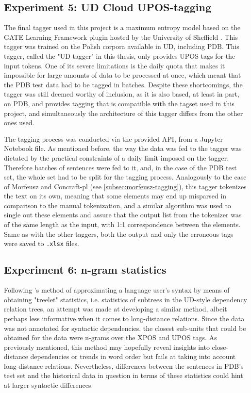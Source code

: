 \subsection{Experiment 5: UD Cloud UPOS-tagging}
\label{subsec:ud-tagging}

The final tagger used in this project is a maximum entropy model based on the GATE Learning Framework plugin hosted by the University of Sheffield \citep{gatecloud}. This tagger was trained on the Polish corpora available in UD, including PDB. This tagger, called the "UD tagger" in this thesis, only provides UPOS tags for the input tokens. One of its severe limitations is the daily quota that makes it impossible for large amounts of data to be processed at once, which meant that the PDB test data had to be tagged in batches. Despite these shortcomings, the tagger was still deemed worthy of inclusion, as it is also based, at least in part, on PDB, and provides tagging that is compatible with the tagset used in this project, and simultaneously the architecture of this tagger differs from the other ones used.

The tagging process was conducted via the provided API, from a Jupyter Notebook file. As mentioned before, the way the data was fed to the tagger was dictated by the practical constraints of a daily limit imposed on the tagger. Therefore batches of sentences were fed to it, and, in the case of the PDB test set, the whole set had to be split for the tagging process. Analogously to the case of Morfeusz and Concraft-pl (see \autoref{subsec:morfeusz-tagging}), this tagger tokenizes the text on its own, meaning that some elements may end up misparsed in comparison to the manual tokenization, and a similar algorithm was used to single out these elements and assure that the output list from the tokenizer was of the same length as the input, with 1:1 correspondence between the elements. Same as with the other taggers, both the output and only the erroneous tags were saved to \texttt{.xlsx} files.

\subsection{Experiment 6: n-gram statistics}
\label{subsec:ngrams}

Following \citet{johannsen-etal-2015-cross}'s method of approximating a language user's syntax by means of obtaining "treelet" statistics, i.e. statistics of subtrees in the UD-style dependency relation trees, an attempt was made at developing a similar method, albeit perhaps less informative when it comes to long-distance relations. Since the data was not annotated for syntactic dependencies, the closest sub-units that could be obtained for the data were n-grams over the XPOS and UPOS tags. As previously mentioned, this method may hopefully reveal insights into close-distance dependencies or trends in word order but fails at taking into account long-distance relations. Nevertheless, differences between the sentences in PDB's test set and the historical data in question in terms of these statistics could hint at larger syntactic differences.

